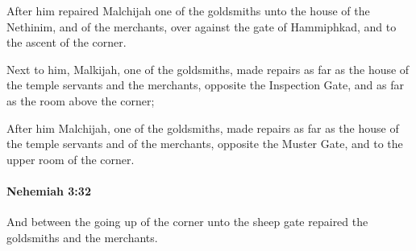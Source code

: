 			\begin{versebox}
					\item[BHS] 
					\item[LXX] 
					\item[ASV] After him repaired Malchijah one of the goldsmiths unto the house of the Nethinim, and of the merchants, over against the gate of Hammiphkad, and to the ascent of the corner.
					\item[NIV] Next to him, Malkijah, one of the goldsmiths, made repairs as far as the house of the temple servants and the merchants, opposite the Inspection Gate, and as far as the room above the corner;
					\item[NRSV] After him Malchijah, one of the goldsmiths, made repairs as far as the house of the temple servants and of the merchants, opposite the Muster Gate, and to the upper room of the corner.
			\end{versebox}

		\paragraph{Nehemiah 3:32} %
			\label{NEHEMIAH-3-32}

			And between the going up of the corner unto the sheep gate repaired the goldsmiths and the merchants.

